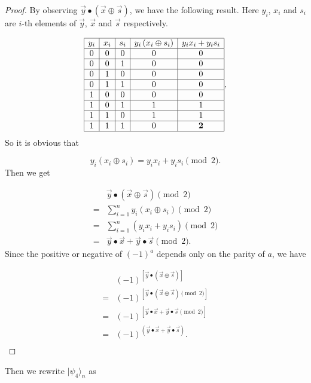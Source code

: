 \begin{proof}
By observing $\vec{y} \bullet(\vec{x} \oplus \vec{s})$, we have the following result. Here $y_i$, $x_i$ and $s_i$ are $i$-th elements of $\vec{y}$, $\vec{x}$ and $\vec{s}$ respectively.

\begin{equation}
    \begin{array}{|c|c|c|c|c|}
\hline y_i & x_i & s_i & y_i\left(x_i \oplus s_i\right) & y_i x_i+y_i s_i\\
\hline 0 & 0 & 0 & 0 & 0 \\
\hline 0 & 0 & 1 & 0 & 0 \\
\hline 0 & 1 & 0 & 0 & 0 \\
\hline 0 & 1 & 1 & 0 & 0 \\
\hline 1 & 0 & 0 & 0 & 0 \\
\hline 1 & 0 & 1 & 1 & 1 \\
\hline 1 & 1 & 0 & 1 & 1 \\
\hline 1 & 1 & 1 & 0 & \textbf{2} \\
\hline
\end{array},
\end{equation}
So it is obvious that

\begin{equation}
    y_i\left(x_i \oplus s_i\right) = y_ix_i + y_is_i \pmod{2}.
\end{equation}
Then we get

\begin{equation}
\begin{aligned}
&  \vec{y} \bullet (\vec{x} \oplus \vec{s}) \pmod{2}\\
= & \sum_{i=1}^n y_i \left(x_i \oplus s_i\right) \pmod{2} \\
= & \sum_{i=1}^n\left(y_i x_i+y_i s_i\right) \pmod{2} \\
= & \vec{y} \bullet \vec{x}+\vec{y} \bullet \vec{s} \pmod{2}.
\end{aligned}
\end{equation}
Since the positive or negative of $(-1)^a$ depends only on the parity of $a$, we have

\begin{equation}
\begin{aligned}
& (-1)^{[\vec{y} \bullet (\vec{x} \oplus \vec{s})]} \\
= & (-1)^{[\vec{y} \bullet (\vec{x} \oplus \vec{s}) \pmod{2}]} \\
= & (-1)^{[\vec{y} \bullet \vec{x}+\vec{y} \bullet \vec{s} \pmod{2}]} \\
= & (-1)^{(\vec{y} \bullet \vec{x}+\vec{y} \bullet \vec{s})}. \\
\end{aligned}
\end{equation}
\end{proof}
Then we rewrite $|\psi_4\rangle_n$ as

